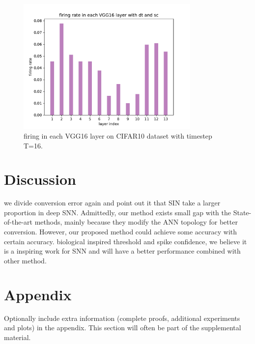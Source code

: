\documentclass{article}
\begin{document}
\begin{figure}[htbp]
  \centering
  \includegraphics[width=0.8\textwidth]{./fig/firing_rate.pdf}
  \caption{firing in each VGG16 layer on CIFAR10 dataset with timestep T=16.}
  \label{firingrate}
\end{figure}

\section{Discussion}
we divide conversion error again and point out it that SIN take a larger proportion in deep SNN.
Admittedly, our method exists small gap with the State-of-the-art methods, mainly because they modify the ANN topology for better conversion.
However, our proposed method could achieve some accuracy with certain accuracy.
biological inspired threshold and spike confidence, we believe it is a inspiring work for SNN and will have a better performance combined with other method.
\newpage




\appendix


\section{Appendix}


Optionally include extra information (complete proofs, additional experiments and plots) in the appendix.
This section will often be part of the supplemental material.
\end{document}
